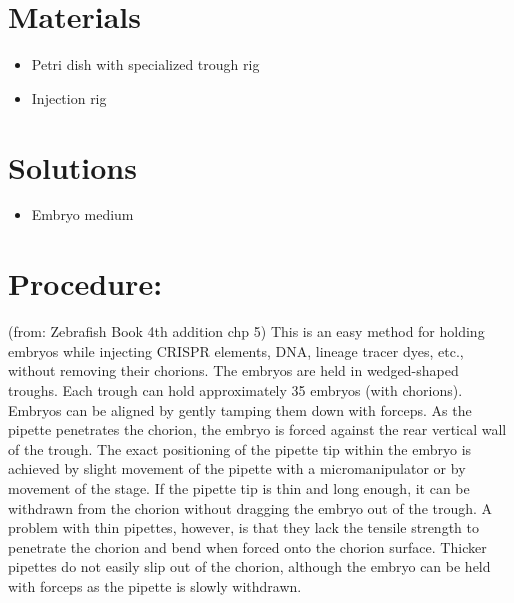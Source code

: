 \documentclass[
  letterpaper,
  DIV=11,
  numbers=noendperiod]{scrreprt}
\providecommand{\tightlist}{%
  \setlength{\itemsep}{0pt}\setlength{\parskip}{0pt}}\usepackage{longtable,booktabs,array}
\begin{document}
\hypertarget{materials-47}{%
\section{Materials}\label{materials-47}}

\begin{itemize}
\tightlist
\item
  Petri dish with specialized trough rig
\item
  Injection rig
\end{itemize}

\hypertarget{solutions-44}{%
\section{Solutions}\label{solutions-44}}

\begin{itemize}
\tightlist
\item
  Embryo medium
\end{itemize}

\hypertarget{procedure-47}{%
\section{Procedure:}\label{procedure-47}}

\begin{tcolorbox}[enhanced jigsaw, bottomtitle=1mm, rightrule=.15mm, toptitle=1mm, opacitybacktitle=0.6, bottomrule=.15mm, titlerule=0mm, coltitle=black, leftrule=.75mm, arc=.35mm, colback=white, colframe=quarto-callout-note-color-frame, left=2mm, colbacktitle=quarto-callout-note-color!10!white, title=\textcolor{quarto-callout-note-color}{\faInfo}\hspace{0.5em}{background}, toprule=.15mm, opacityback=0, breakable]

(from: Zebrafish Book 4th addition chp 5) This is an easy method for
holding embryos while injecting CRISPR elements, DNA, lineage tracer
dyes, etc., without removing their chorions. The embryos are held in
wedged-shaped troughs. Each trough can hold approximately 35 embryos
(with chorions). Embryos can be aligned by gently tamping them down with
forceps. As the pipette penetrates the chorion, the embryo is forced
against the rear vertical wall of the trough. The exact positioning of
the pipette tip within the embryo is achieved by slight movement of the
pipette with a micromanipulator or by movement of the stage. If the
pipette tip is thin and long enough, it can be withdrawn from the
chorion without dragging the embryo out of the trough. A problem with
thin pipettes, however, is that they lack the tensile strength to
penetrate the chorion and bend when forced onto the chorion surface.
Thicker pipettes do not easily slip out of the chorion, although the
embryo can be held with forceps as the pipette is slowly withdrawn.

\end{tcolorbox}
\end{document}
